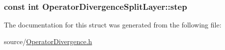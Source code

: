 \subsubsection[{step}]{\setlength{\rightskip}{0pt plus 5cm}const int Operator\+Divergence\+Split\+Layer\+::step}\label{struct_operator_divergence_split_layer_a40f9ce0dcd01080cc50c0ce22a4a3eb4}


The documentation for this struct was generated from the following file\+:\begin{DoxyCompactItemize}
\item 
source/\hyperlink{_operator_divergence_8h}{Operator\+Divergence.\+h}\end{DoxyCompactItemize}
